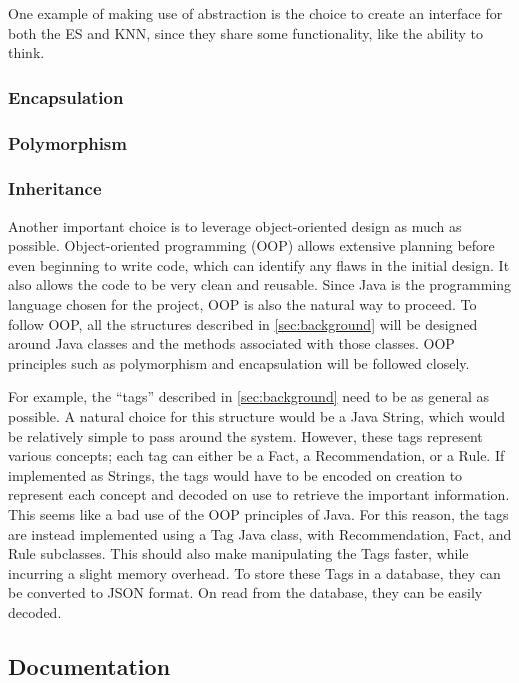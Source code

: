 \documentclass[titlepage,11pt]{article}
\begin{document}
One example of making use of abstraction is the choice to create an interface for both the ES and KNN, since they share some functionality, like the ability to think.

\subsubsection{Encapsulation}

\subsubsection{Polymorphism}

\subsubsection{Inheritance}

Another important choice is to leverage object-oriented design as much as possible. Object-oriented programming (OOP) allows extensive planning before even beginning to write code, which can identify any flaws in the initial design. It also allows the code to be very clean and reusable. Since Java is the programming language chosen for the project, OOP is also the natural way to proceed. To follow OOP, all the structures described in \autoref{sec:background} will be designed around Java classes and the methods associated with those classes. OOP principles such as polymorphism and encapsulation will be followed closely.

For example, the ``tags'' described in \autoref{sec:background} need to be as general as possible. A natural choice for this structure would be a Java String, which would be relatively simple to pass around the system. However, these tags represent various concepts; each tag can either be a Fact, a Recommendation, or a Rule. If implemented as Strings, the tags would have to be encoded on creation to represent each concept and decoded on use to retrieve the important information. This seems like a bad use of the OOP principles of Java. For this reason, the tags are instead implemented using a Tag Java class, with Recommendation, Fact, and Rule subclasses. This should also make manipulating the Tags faster, while incurring a slight memory overhead. To store these Tags in a database, they can be converted to JSON format. On read from the database, they can be easily decoded.

\subsection{Documentation}
\end{document}
